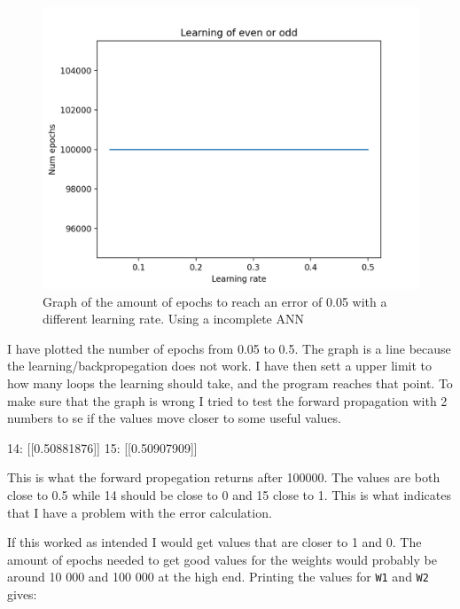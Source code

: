 \documentclass[10pt]{article}
\begin{document}
    \begin{center}
        \begin{figure}[h!]
            \includegraphics[scale=0.7]{Figure_1.png}
            \caption{Graph of the amount of epochs to reach an error of 0.05 with a different learning rate. Using a incomplete ANN}
        \end{figure}
    \end{center}

    I have plotted the number of epochs from 0.05 to 0.5. The graph is a line because the learning/backpropegation does not work. I have then sett a upper limit to how many loops the learning should take, and the program reaches that point. To make sure that the graph is wrong I tried to test the forward propagation with 2 numbers to se if the values move closer to some useful values.

    \begin{pythoncode}
    14: [[0.50881876]]
    15: [[0.50907909]]
    \end{pythoncode}

    This is what the forward propegation returns after 100000. The values are both close to 0.5 while 14 should be close to 0 and 15 close to 1. This is what indicates that I have a problem with the error calculation.

    If this worked as intended I would get values that are closer to 1 and 0. The amount of epochs needed to get good values for the weights would probably be around 10 000 and 100 000 at the high end. Printing the values for \texttt{W1} and \texttt{W2} gives:
\end{document}
